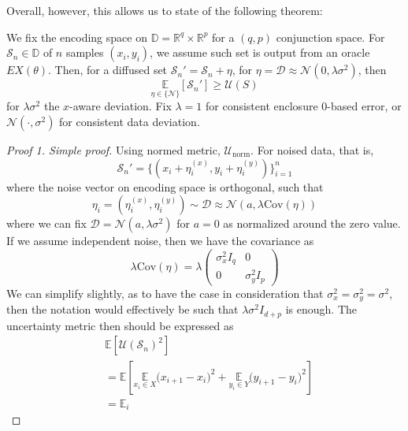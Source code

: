 \documentclass[
  journal=largetwo,
  year=2025,
  volume=37,
]{cup-journal}
\begin{document}
Overall, however, this allows us to state of the following theorem: 

\begin{theorem}
    We fix the encoding space on $\mathbb{D}=\mathbb{R}^{q}\times\mathbb{R}^{p}$ for a $(q,p)$ conjunction space. For $\mathcal{S}_{n}\in\mathbb{D}$ of $n$ samples $(x_{i},y_{i})$, we assume such set is output from an oracle $EX(\theta)$. Then, for a diffused set $\mathcal{S}_{n}'=\mathcal{S}_{n}+\eta$, for $\eta=\mathcal{D}\approx \mathcal{N}(0,\lambda\sigma^{2})$, then
    \begin{equation}
        \underset{\eta \in \{\mathcal{N}\}}{\mathbb{E}} [\mathcal{S}_{n}'] \geq \mathcal{U}(S)
    \end{equation}
    for $\lambda \sigma^{2}$ the $x$-aware deviation. Fix $\lambda=1$ for consistent enclosure $0$-based error, or $\mathcal{N}(\cdot,\sigma^{2})$ for consistent data deviation. 
\end{theorem}

\begin{proof}[Proof 1. Simple proof]
    Using normed metric, $\mathcal{U}_{\mathrm{norm}}$. For noised data, that is, \begin{equation}
        \mathcal{S}_{n}' = \{(x_{i}+\eta^{(x)}_{i}, y_{i}+\eta^{(y)}_{i})\}^{n}_{i=1}
    \end{equation}
    where the noise vector on encoding space is orthogonal, such that \begin{equation}
        \eta_{i}=(\eta_{i}^{(x)},\eta_{i}^{(y)})\sim\mathcal{D}\approx \mathcal{N}\left(a,\lambda\mathrm{Cov}(\eta)\right)
    \end{equation}
    where we can fix $\mathcal{D}=\mathcal{N}(a,\lambda\sigma^{2})$ for $a=0$ as normalized around the zero value. If we assume independent noise, then we have the covariance as 
    \begin{equation}
        \lambda \mathrm{Cov}(\eta)= \lambda\begin{pmatrix}
            \sigma_x^2 I_q & 0 \\
            0 & \sigma_y^2 I_p
        \end{pmatrix}
    \end{equation}
    We can simplify slightly, as to have the case in consideration that $\sigma^{2}_{x}=\sigma^{2}_{y}=\sigma^{2}$, then the notation would effectively be such that $\lambda\sigma^{2}I_{d+p}$ is enough. The uncertainty metric then should be expressed as 
    \begin{equation}
        \begin{split}
            &\mathbb{E}[\mathcal{U}(\mathcal{S}_{n})^{2} ] \\
            &= \mathbb{E}\left[\underset{x_{i}\in X}{\mathbb{E}}\Big( x_{i+1} - x_{i} \Big)^{2} + \underset{y_{i}\in Y}{\mathbb{E}} \Big( y_{i+1}- y_{i} \Big)^{2}\right]\\
            & = \mathbb{E}_{i}
        \end{split}
    \end{equation}
\end{proof}
\end{document}
